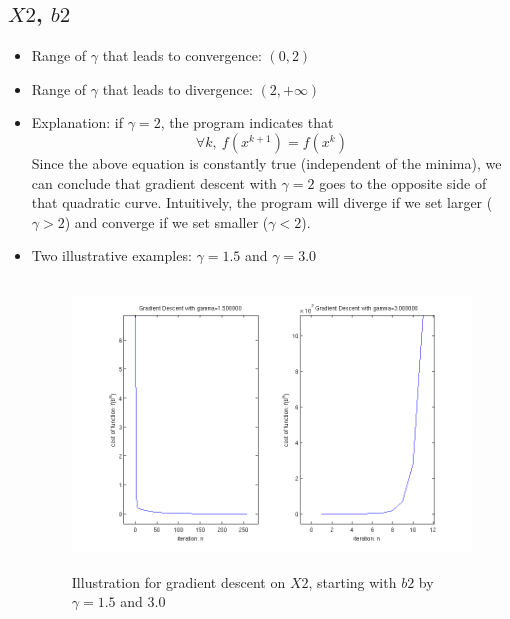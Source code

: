 \documentclass[11pt,a4paper]{article}
\begin{document}
\subsection{$X2$, $b2$}
\begin{itemize}
    \item Range of $\gamma$ that leads to convergence: $(0,2)$
    \item Range of $\gamma$ that leads to divergence: $(2,+\infty)$
    \item Explanation: if $\gamma = 2$, the program indicates that 
        $$ \forall k,\ f(x^{k+1}) = f(x^{k})$$ 
        Since the above equation is constantly true (independent of the
        minima), we can conclude that gradient descent with $\gamma = 2$ goes 
        to the opposite side of that quadratic curve. Intuitively, the program 
        will diverge if we set larger ($\gamma>2$) and converge if we set smaller
        ($\gamma<2$).
    \item Two illustrative
        examples: $\gamma = 1.5$ and $\gamma = 3.0$
        \begin{figure}[h]
            \centering
            \includegraphics[width=6in,height=3in]{../ps1_matlab/2.png}
            \caption{Illustration for gradient descent on $X2$, starting with
                $b2$ by $\gamma = 1.5$ and $3.0$}
        \end{figure}
\end{itemize}

\newpage
\end{document}
